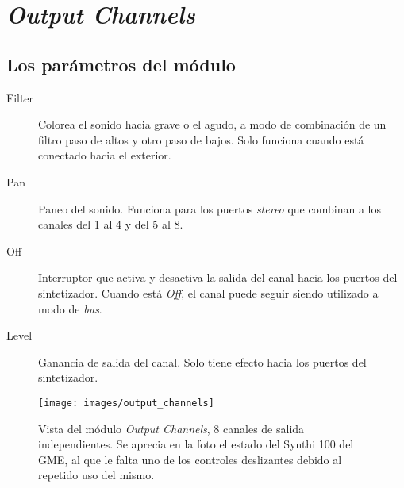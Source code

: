 \section[Output Channels]{\textit{Output Channels}}
\label{sec:output_channels}

\subsection{Los parámetros del módulo}

\begin{description}
	\item[Filter] Colorea el sonido hacia grave o el agudo, a modo de combinación de un filtro paso de altos y otro paso de bajos. Solo funciona cuando está conectado hacia el exterior.
	\item[Pan] Paneo del sonido. Funciona para los puertos \textit{stereo} que combinan a los canales del 1 al 4 y del 5 al 8.
	\item[Off] Interruptor que activa y desactiva la salida del canal hacia los puertos del sintetizador. Cuando está \textit{Off}, el canal puede seguir siendo utilizado a modo de \textit{bus}.
	\item[Level] Ganancia de salida del canal. Solo tiene efecto hacia los puertos del sintetizador.
\end{description}

\begin{figure}
	\centering
	\texttt{[image: images/output\_channels]}
	\caption[\textit{Output Channels}]{Vista del módulo \textit{Output Channels}, 8 canales de salida independientes. Se aprecia en la foto el estado del Synthi 100 del GME, al que le falta uno de los controles deslizantes debido al repetido uso del mismo.}
	\label{fig:output_channels}
\end{figure}